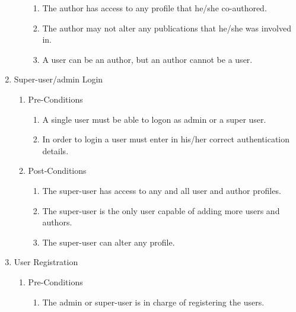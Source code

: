 \documentclass[hidelinks,a4paper,12pt]{article}
\begin{document}
\begin{enumerate}
\begin{enumerate}
			\begin{enumerate}
				\item  The author has access to any profile that he/she co-authored.
				
				\item  The author may not alter any publications that he/she was involved in.
				
				\item  A user can be an author, but an author cannot be a user.
			\end{enumerate}
		\end{enumerate}
		
		\noindent  
		
		\item  Super-user/admin Login
		
		\begin{enumerate}
			\item  Pre-Conditions
			
			\begin{enumerate}
				\item  A single user must be able to logon as admin or a super user.
				
				\item  In order to login a user must enter in his/her correct authentication details.
			\end{enumerate}
			
			\item  Post-Conditions
			
			\begin{enumerate}
				\item  The super-user has access to any and all user and author profiles.
				
				\item  The super-user is the only user capable of adding more users and authors.
				
				\item  The super-user can alter any profile.
			\end{enumerate}
		\end{enumerate}
		
		\noindent  
		
		\item  User Registration
		
		\begin{enumerate}
			\item  Pre-Conditions
			
			\begin{enumerate}
				\item  The admin or super-user is in charge of registering the users.
			\end{enumerate}
			

\end{enumerate}
\end{enumerate}
\end{document}
